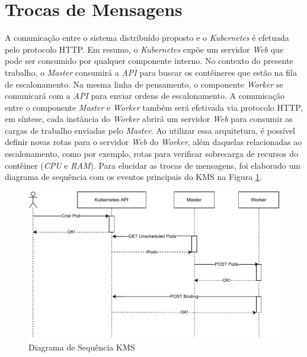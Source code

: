 \section{Trocas de Mensagens}

A comunicação entre o sistema distribuído proposto e o \textit{Kubernetes} é efetuada pelo protocolo \ac{HTTP}. Em resumo, o \textit{Kubernetes} expõe um servidor \textit{Web} que pode ser consumido por qualquer componente interno. No contexto do presente trabalho, o \textit{Master} consumirá a \textit{API} para buscar os contêineres que estão na fila de escalonamento. Na mesma linha de pensamento, o componente \textit{Worker} se comunicará com a \textit{API} para enviar ordens de escalonamento. A comunicação entre o componente \textit{Master} e \textit{Worker} também será efetivada via protocolo \ac{HTTP}, em síntese, cada instância do \textit{Worker} abrirá um servidor \textit{Web} para consumir as cargas de trabalho enviadas pelo \textit{Master}. Ao utilizar essa arquitetura, é possível definir novas rotas para o servidor \textit{Web} do \textit{Worker}, além daquelas relacionadas ao escalonamento, como por exemplo, rotas para verificar sobrecarga de recursos do contêiner (\textit{CPU} e \textit{RAM}). Para elucidar as trocas de mensagens, foi elaborado um diagrama de sequência com os eventos principais do \ac{KMS} na Figura \ref{fig:sequencia}. 

\begin{figure}[h!]
	\caption{\label{fig:sequencia}Diagrama de Sequência \ac{KMS}}
	\centering
	\includegraphics[width=\linewidth]{assets/sequencia.pdf}
\end{figure}

